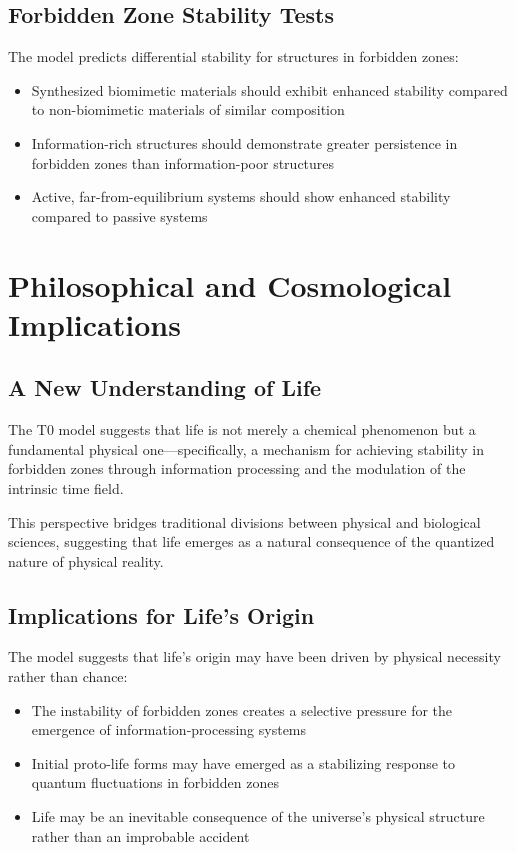 \documentclass[12pt,a4paper]{article}
\begin{document}
	\subsection{Forbidden Zone Stability Tests}
	\label{subsec:forbidden_zone_tests}
	
	The model predicts differential stability for structures in forbidden zones:
	
	\begin{itemize}
		\item Synthesized biomimetic materials should exhibit enhanced stability compared to non-biomimetic materials of similar composition
		\item Information-rich structures should demonstrate greater persistence in forbidden zones than information-poor structures
		\item Active, far-from-equilibrium systems should show enhanced stability compared to passive systems
	\end{itemize}
	
	\section{Philosophical and Cosmological Implications}
	\label{sec:philosophical_implications}
	
	\subsection{A New Understanding of Life}
	\label{subsec:new_understanding}
	
	The T0 model suggests that life is not merely a chemical phenomenon but a fundamental physical one—specifically, a mechanism for achieving stability in forbidden zones through information processing and the modulation of the intrinsic time field.
	
	This perspective bridges traditional divisions between physical and biological sciences, suggesting that life emerges as a natural consequence of the quantized nature of physical reality.
	
	\subsection{Implications for Life's Origin}
	\label{subsec:origin_implications}
	
	The model suggests that life's origin may have been driven by physical necessity rather than chance:
	
	\begin{itemize}
		\item The instability of forbidden zones creates a selective pressure for the emergence of information-processing systems
		\item Initial proto-life forms may have emerged as a stabilizing response to quantum fluctuations in forbidden zones
		\item Life may be an inevitable consequence of the universe's physical structure rather than an improbable accident
	\end{itemize}
\end{document}
